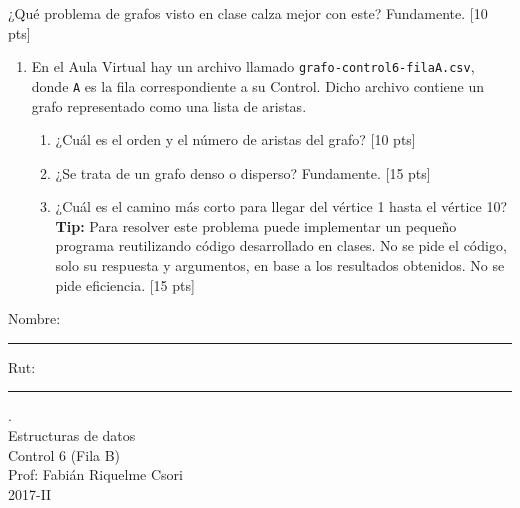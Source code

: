 \documentclass[letter,12pt,oneside]{book}
\theoremstyle{definition}
\begin{document}
  \begin{enumerate}
      {\setlength\itemindent{43pt} \item[b)] ¿Qué problema de grafos visto en clase calza mejor con este? Fundamente. \tabto{86ex} [10 pts]}
  \end{enumerate}
  \begin{enumerate}
    \item[2.] En el Aula Virtual hay un archivo llamado \texttt{grafo-control6-filaA.csv}, donde \texttt{A} es la fila correspondiente a su Control. Dicho archivo contiene un grafo representado como una lista de aristas.
    \begin{enumerate}
        \item ¿Cuál es el orden y el número de aristas del grafo? \tabto{81ex} [10 pts]
        \item ¿Se trata de un grafo denso o disperso? Fundamente. \tabto{81ex} [15 pts]
        \item ¿Cuál es el camino más corto para llegar del vértice 1 hasta el vértice 10?\\[1.5ex]
        \textbf{Tip:} Para resolver este problema puede implementar un pequeño programa reutilizando código desarrollado en clases. No se pide el código, solo su respuesta y argumentos, en base a los resultados obtenidos. No se pide eficiencia. \tabto{81ex} [15 pts]
    \end{enumerate}
\end{enumerate}

\newpage
\noindent
Nombre: \rule{.6\textwidth}{.5pt} Rut: \rule{.24\textwidth}{.5pt}

\begin{center}
 {\Large
  {\color{white}.}\\
  Estructuras de datos\\[1ex]
  Control 6 (Fila B)}\\[1.2ex]
  Prof: Fabián Riquelme Csori\\
  2017-II
\end{center}
\end{document}

